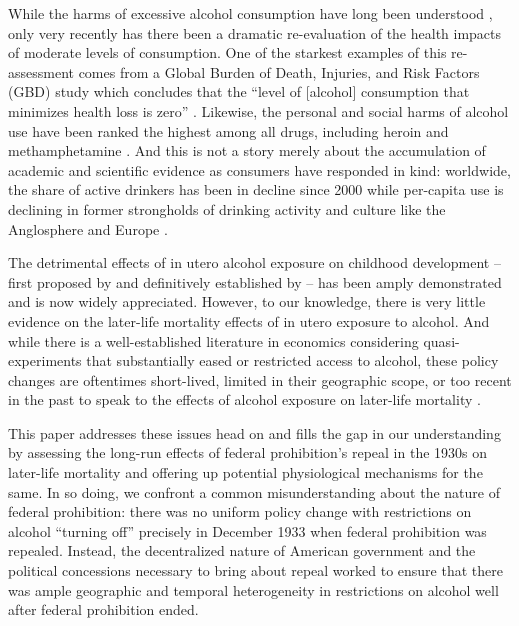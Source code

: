 \documentclass[12pt]{article}
\begin{document}
While the harms of excessive alcohol consumption have long been understood , only very recently has there been a dramatic re-evaluation of the health impacts of moderate levels of consumption. 
One of the starkest examples of this re-assessment comes from a Global Burden of Death, Injuries, and Risk Factors (GBD) study which concludes that the ``level of [alcohol] consumption that minimizes health loss is zero'' .  
Likewise, the personal and social harms of alcohol use have been ranked the highest among all drugs, including heroin and methamphetamine . 
And this is not a story merely about the accumulation of academic and scientific evidence as consumers have responded in kind: worldwide, the share of active drinkers has been in decline since 2000 while per-capita use is declining in former strongholds of drinking activity and culture like the Anglosphere and Europe . 

The detrimental effects of in utero alcohol exposure on childhood development -- first proposed by  and definitively established by  -- has been amply demonstrated and is now widely appreciated. 
However, to our knowledge, there is very little evidence on the later-life mortality effects of in utero exposure to alcohol. 
And while there is a well-established literature in economics considering quasi-experiments that substantially eased or restricted access to alcohol, these policy changes are oftentimes short-lived, limited in their geographic scope, or too recent in the past to speak to the effects of alcohol exposure on later-life mortality . 

This paper addresses these issues head on and fills the gap in our understanding by assessing the long-run effects of federal prohibition's repeal in the 1930s on later-life mortality and offering up potential physiological mechanisms for the same. 
In so doing, we confront a common misunderstanding about the nature of federal prohibition: there was no uniform policy change with restrictions on alcohol ``turning off'' precisely in December 1933 when federal prohibition was repealed. 
Instead, the decentralized nature of American government and the political concessions necessary to bring about repeal worked to ensure that there was ample geographic and temporal heterogeneity in restrictions on alcohol well after federal prohibition ended.
\end{document}
